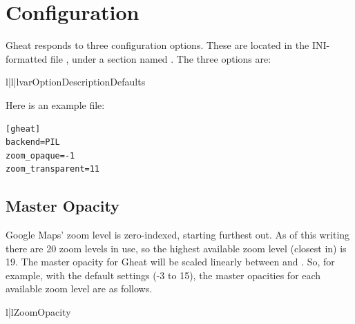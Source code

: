 \documentclass{manual}
\begin{document}

\chapter{Configuration}
\label{configuration}

Gheat responds to three configuration options. These are located in the
INI-formatted file , under a section named
\code{[gheat]}. The three options are:

\begin{tableiii}{l|l|l}{var}{Option}{Description}{Defaults}
\end{tableiii}

Here is an example  file:

\begin{verbatim}
[gheat]
backend=PIL
zoom_opaque=-1
zoom_transparent=11
\end{verbatim}


\section{Master Opacity}

Google Maps' zoom level is zero-indexed, starting furthest out. As of this
writing there are 20 zoom levels in use, so the highest available zoom level
(closest in) is 19. The master opacity for Gheat will be scaled linearly between
 and . So, for example, with the default
settings (-3 to 15), the master opacities for each available zoom level are as 
follows.

\begin{tableii}{l|l}{}{Zoom}{Opacity}
\end{tableii}
\end{document}
